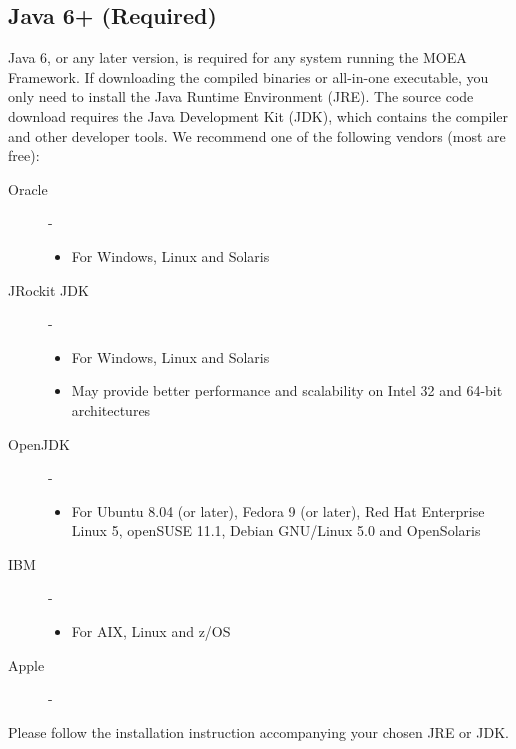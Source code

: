 \subsection{Java 6+ (Required)}
Java 6, or any later version, is required for any system running the MOEA Framework.  If downloading the compiled binaries or all-in-one executable, you only need to install the Java Runtime Environment (JRE).  The source code download requires the Java Development Kit (JDK), which contains the compiler and other developer tools.  We recommend one of the following vendors (most are free):

\begin{description}
  \item[Oracle] - 
    \begin{itemize}
      \item For Windows, Linux and Solaris
    \end{itemize}
    
  \item[JRockit JDK] - 
    \begin{itemize}
      \item For Windows, Linux and Solaris
      \item May provide better performance and scalability on Intel 32 and 64-bit architectures
    \end{itemize}

  \item[OpenJDK] - 
    \begin{itemize}
      \item For Ubuntu 8.04 (or later), Fedora 9 (or later), Red Hat Enterprise Linux 5, openSUSE 11.1, Debian GNU/Linux 5.0 and OpenSolaris
    \end{itemize}

  \item[IBM] - 
    \begin{itemize}
      \item For AIX, Linux and z/OS
    \end{itemize}
  \item[Apple] - 
\end{description}

Please follow the installation instruction accompanying your chosen JRE or JDK.

